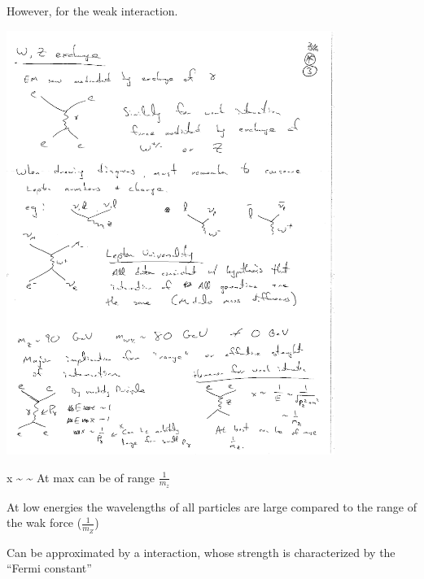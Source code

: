 {However, for the weak interaction. 

\begin{minipage}{0.4\textwidth}
\includegraphics[width=0.8\textwidth]{./eeZScattering.pdf}   
\end{minipage} %
\begin{minipage}{0.45\textwidth}
\bea
x \sim {} \sim {} 
\eea
At max can be of range $\frac{1}{m_z}$
\end{minipage} %

At low energies the wavelengths of all particles are large compared  to the range of the wak force ($\frac{1}{m_Z}$)

\clearpage

Can be approximated by a  interaction, whose strength is characterized by the ``Fermi constant'' 

}
